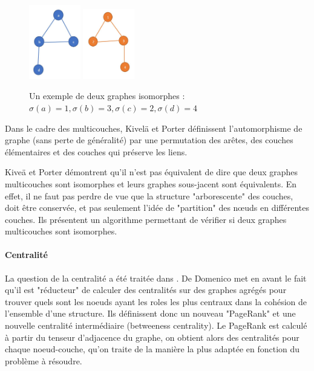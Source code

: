 \documentclass[11pt,a4paper]{article}
\theoremstyle{definition}
\theoremstyle{remark}
\theoremstyle{remark}
\begin{document}
\begin{figure}
\centering
	\includegraphics[width=0.2\textwidth]{graph1iso.JPG}
	\includegraphics[width=0.2\textwidth]{graph2iso.JPG} 
	
	\caption{Un exemple de deux graphes isomorphes : $\sigma(a)=1, \sigma(b)=3, \sigma(c)=2, \sigma(d)=4$}
\end{figure}

Dans le cadre des multicouches, Kivelä et Porter \cite{isoMulti} définissent l'automorphisme de graphe (sans perte de généralité) par une permutation des arêtes, des couches élémentaires et des couches qui préserve les liens.


Kiveä et Porter démontrent qu'il n'est pas équivalent de dire que deux graphes multicouches sont isomorphes et leurs graphes sous-jacent sont équivalents. En effet, il ne faut pas perdre de vue que la structure "arborescente" des couches, doit être conservée, et pas seulement l'idée de "partition" des nœuds en différentes couches. Ils présentent un algorithme permettant de vérifier si deux graphes multicouches sont isomorphes.

\paragraph{Centralité}

La question de la centralité a été traitée dans \cite{centraliteMulti}. De Domenico met en avant le fait qu'il est "réducteur" de calculer des centralités sur des graphes agrégés pour trouver quels sont les noeuds ayant les roles les plus centraux dans la cohésion de l'ensemble d'une structure. Ils définissent donc un nouveau "PageRank" et une nouvelle centralité intermédiaire (betweeness centrality). Le PageRank est calculé à partir du tenseur d'adjacence du graphe, on obtient alors des centralités pour chaque noeud-couche, qu'on traite de la manière la plus adaptée en fonction du problème à résoudre.
\end{document}
